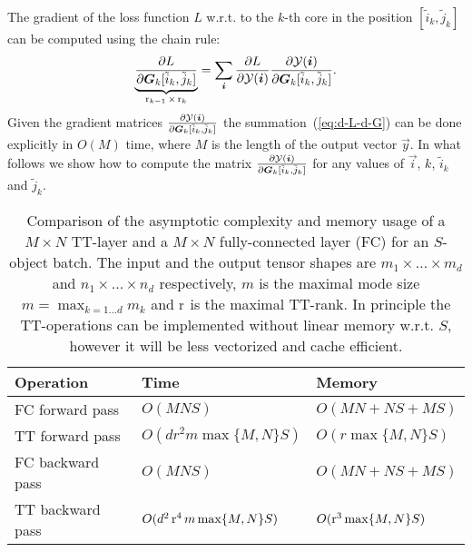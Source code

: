 The gradient of the loss function $L$ w.r.t. to the $k$-th core in the position $[\tilde{i}_k, \tilde{j}_k]$ can be computed using the chain rule:
\begin{equation}
\label{eq:d-L-d-G}
\underbrace{\frac{\partial{L}}{\partial{\boldsymbol{G}_k[\tilde{i}_k, \tilde{j}_k]}}}_{\operatorname{r}_{k-1} \times \operatorname{r}_{k}} = \sum_{\boldsymbol{i}} \frac{\partial{L}}{\partial{\mathcal{Y}(\boldsymbol{i})}} \frac{\partial{\mathcal{Y}}(\boldsymbol{i})}{\partial{\boldsymbol{G}_k[\tilde{i}_k, \tilde{j}_k]}}.
\end{equation}
Given the gradient matrices $\frac{\partial{\mathcal{Y}}(\boldsymbol{i})}{\partial{\boldsymbol{G}_k[\tilde{i}_k, \tilde{j}_k]}}$ the summation~(\ref{eq:d-L-d-G}) can be done explicitly in $O(M)$ time, where $M$ is the length of the output vector $\vec{y}$. In what follows we show how to compute the matrix $\frac{\partial{\mathcal{Y}}(\boldsymbol{i})}{\partial{\boldsymbol{G}_k[\tilde{i}_k, \tilde{j}_k]}}$ for any values of $\vec{i}$, $k$, $\tilde{i}_k$ and $\tilde{j}_k$.

\begin{table}\begin{center}
    \begin{tabular}{ l | l | l }
    Operation & Time & Memory \rule{0pt}{1.0\normalbaselineskip} \\ \hline
    FC forward pass & $O(M N S)$ & $O(M N + N S + M S)$ \rule{0pt}{1.0\normalbaselineskip}\\ %
    TT forward pass & $O(d r^2 m \max\{M, N\} S)$ & $O(r \max\{M, N\} S)$ \\ %
    FC backward pass & $O(M N S)$ & $O(M N + N S + M S)$ \\ %
    TT backward pass & $O(d^2 \operatorname{r}^4 m \max\{M, N\} S)$ & $O(\operatorname{r}^3 \max\{M, N\} S)$ \\[-0.5cm] %
    \end{tabular}
    \end{center}
    \caption{Comparison of the asymptotic complexity and memory usage of a $M \times N$ TT-layer and a $M \times N$ fully-connected layer (FC) for an $S$-object batch. The input and the output tensor shapes are $m_1 \times \ldots \times m_d$ and $n_1 \times \ldots \times n_d$ respectively, $m$ is the maximal mode size $m = \max_{k = 1 \ldots d} m_k$ and $\operatorname{r}$ is the maximal TT-rank. In principle the TT-operations can be implemented without linear memory w.r.t. $S$, however it will be less vectorized and cache efficient.\label{tbl:complexity-comparison}\vspace{-0.4cm}}
\end{table}


